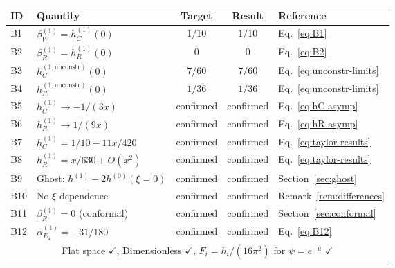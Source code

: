 \documentclass[11pt,a4paper]{article}
\theoremstyle{definition}
\theoremstyle{remark}
\begin{document}
\begin{center}
\renewcommand{\arraystretch}{1.3}
\begin{tabular}{llccl}
\toprule
\textbf{ID} & \textbf{Quantity} & \textbf{Target} & \textbf{Result} & \textbf{Reference} \\
\midrule
B1 & $\beta_W^{(1)} = h_C^{(1)}(0)$ & $1/10$ & $1/10$ & Eq.~\eqref{eq:B1} \\
B2 & $\beta_R^{(1)} = h_R^{(1)}(0)$ & $0$ & $0$ & Eq.~\eqref{eq:B2} \\
B3 & $h_C^{(1,\mathrm{unconstr})}(0)$ & $7/60$ & $7/60$ & Eq.~\eqref{eq:unconstr-limits} \\
B4 & $h_R^{(1,\mathrm{unconstr})}(0)$ & $1/36$ & $1/36$ & Eq.~\eqref{eq:unconstr-limits} \\
B5 & $h_C^{(1)} \to -1/(3x)$ & confirmed & confirmed & Eq.~\eqref{eq:hC-asymp} \\
B6 & $h_R^{(1)} \to 1/(9x)$ & confirmed & confirmed & Eq.~\eqref{eq:hR-asymp} \\
B7 & $h_C^{(1)} = 1/10 - 11x/420$ & confirmed & confirmed & Eq.~\eqref{eq:taylor-results} \\
B8 & $h_R^{(1)} = x/630 + O(x^2)$ & confirmed & confirmed & Eq.~\eqref{eq:taylor-results} \\
B9 & Ghost: $h^{(1)} - 2h^{(0)}(\xi\!=\!0)$ & confirmed & confirmed & Section~\ref{sec:ghost} \\
B10 & No $\xi$-dependence & confirmed & confirmed & Remark~\ref{rem:differences} \\
B11 & $\beta_R^{(1)}=0$ (conformal) & confirmed & confirmed & Section~\ref{sec:conformal} \\
B12 & $\alpha_{E_4}^{(1)} = -31/180$ & confirmed & confirmed & Eq.~\eqref{eq:B12} \\
\midrule
\multicolumn{5}{c}{Flat space $\checkmark$, Dimensionless $\checkmark$,
$F_i = h_i/(16\pi^2)$ for $\psi=e^{-u}$ $\checkmark$} \\
\bottomrule
\end{tabular}
\end{center}
\end{document}
